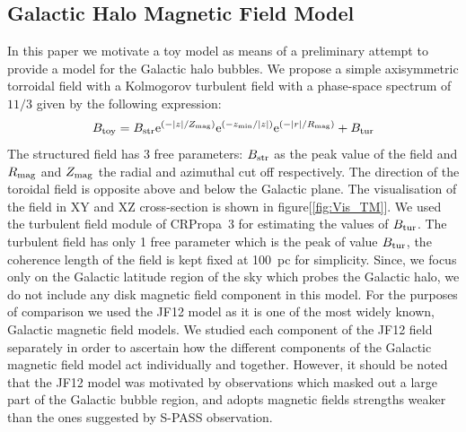 \documentclass[12pt, a4 paper]{article}
\newcommand{\Andrew}[1]{\textcolor{dg}{#1}}
\newcommand{\Arjen}[1]{{\color{brown}#1}}
\begin{document}
\subsection{Galactic Halo Magnetic Field Model}
In this paper we motivate a toy model as means of a preliminary attempt to provide a model for the Galactic halo bubbles. We propose a simple axisymmetric torroidal field with a Kolmogorov turbulent field with a phase-space spectrum of $11/3$ given by the following expression:
\begin{equation}\label{TM_equation}
        B_{\mathrm{toy}}= B_{\rm{str}}\mathrm{e}^{{(-\abs{{z}}/Z_{{\mathrm{mag}}})}} \mathrm{e}^{{(-z_{{\mathrm{min}}}/\abs{{z}})}}\mathrm{e}^{{(-\abs{{r}}/R_{{\mathrm{mag}}})}} + B_{\rm{tur}}
\end{equation}
The structured field has 3 free parameters: $B_{\rm str}$ as the peak value of the field and $R_{\rm {mag}}$ and $Z_{\rm {mag}}$ the radial and azimuthal cut off respectively. The direction of the toroidal field is opposite above and below the Galactic plane. The visualisation of the field in XY and XZ cross-section is shown in figure[\ref{fig:Vis_TM}]. We used the turbulent field module of CRPropa~3 \cite{CRPropa3_2016} for estimating the values of $B_{\rm{tur}}$. The turbulent field has only 1 free parameter which is the peak of value $ B_{\rm{tur}}$, the coherence length of the field is kept fixed at 100~pc for simplicity. %
Since, we focus only on the Galactic latitude region of the sky which probes the Galactic halo, we do not include any disk magnetic field component in this model. 
For the purposes of comparison we used the JF12 model as it is one of the most widely known, Galactic magnetic field models.
We studied each component of the JF12 field separately in order to ascertain how the different components of the Galactic magnetic field model act individually and together. However, it should be noted that the JF12 model was motivated by observations which masked out a large part of the Galactic bubble region, and adopts magnetic fields strengths weaker than the ones suggested by S-PASS observation.%
\end{document}
